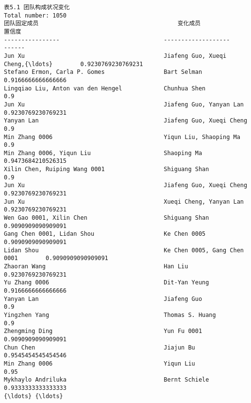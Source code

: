\documentclass[11pt]{article}
\begin{document}
    \begin{Verbatim}[commandchars=\\\{\}]
                          表5.1 团队构成状况变化                      
Total number: 1050
团队固定成员                                        变化成员                         置信度       
----------------                              -------------------                 ------         
Jun Xu                                        Jiafeng Guo, Xueqi Cheng,{\ldots}        0.9230769230769231
Stefano Ermon, Carla P. Gomes                 Bart Selman                         0.9166666666666666
Lingqiao Liu, Anton van den Hengel            Chunhua Shen                        0.9            
Jun Xu                                        Jiafeng Guo, Yanyan Lan             0.9230769230769231
Yanyan Lan                                    Jiafeng Guo, Xueqi Cheng            0.9            
Min Zhang 0006                                Yiqun Liu, Shaoping Ma              0.9            
Min Zhang 0006, Yiqun Liu                     Shaoping Ma                         0.9473684210526315
Xilin Chen, Ruiping Wang 0001                 Shiguang Shan                       0.9            
Jun Xu                                        Jiafeng Guo, Xueqi Cheng            0.9230769230769231
Jun Xu                                        Xueqi Cheng, Yanyan Lan             0.9230769230769231
Wen Gao 0001, Xilin Chen                      Shiguang Shan                       0.9090909090909091
Gang Chen 0001, Lidan Shou                    Ke Chen 0005                        0.9090909090909091
Lidan Shou                                    Ke Chen 0005, Gang Chen 0001        0.9090909090909091
Zhaoran Wang                                  Han Liu                             0.9230769230769231
Yu Zhang 0006                                 Dit-Yan Yeung                       0.9166666666666666
Yanyan Lan                                    Jiafeng Guo                         0.9            
Yingzhen Yang                                 Thomas S. Huang                     0.9            
Zhengming Ding                                Yun Fu 0001                         0.9090909090909091
Chun Chen                                     Jiajun Bu                           0.9545454545454546
Min Zhang 0006                                Yiqun Liu                           0.95           
Mykhaylo Andriluka                            Bernt Schiele                       0.9333333333333333
{\ldots} {\ldots}

    \end{Verbatim}
\end{document}
